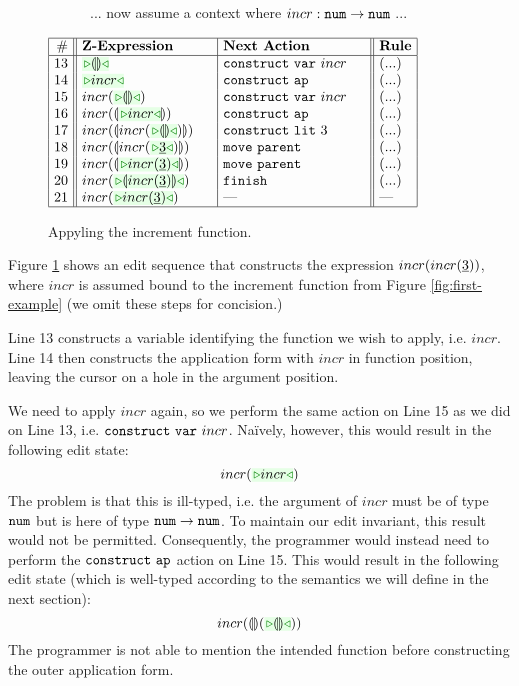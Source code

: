 \begin{figure}[t!]
\colorbox{light-gray}{~~~~~~... now assume a context where $incr : \texttt{num} \rightarrow \texttt{num}$ ...~~~~~~}

$\arraycolsep=4px
\begin{array}{|r||l|l||l|l|}
\hline
\# & \textbf{Z-Expression} & 
\textbf{Next Action} & \textbf{Rule}
\\
\hline
13 &
\zwsel{\hhole{}} & 
\aConstruct{\fvar{incr}} \hphantom{~\,\,~~}& 
\text{(...)}
\\ 14 & 
\zwsel{incr} & 
\aConstruct{\fap} & 
\text{(...)}
\\ 15 & 
incr(\zwsel{\hhole{}}) & 
\aConstruct{\fvar{incr}} & 
\text{(...)}
\\ 16 & 
incr(\hhole{\zwsel{incr}}) & 
\aConstruct{\fap} & 
\text{(...)}
\\ 17 & 
incr(\hhole{incr(\zwsel{\hhole{}})}) \hphantom{~~~~} & 
\aConstruct{\fnumlit{3}} & 
\text{(...)}
\\ 18 & 
incr(\hhole{incr(\zwsel{\hnum{3}})}) & 
\aMove{\dParent}& 
\text{(...)}
\\ 19 & 
incr(\hhole{\zwsel{incr(\hnum{3})}}) & 
\aMove{\dParent} & 
\text{(...)}
\\ 20 &
incr(\zwsel{\hhole{incr(\hnum{3})}})& 
\aFinish & 
\text{(...)}
\\ 21 & 
incr(\zwsel{incr(\hnum{3})}) & 
\textrm{---} & 
{\textrm{---}}
\\ \hline
\end{array}
$
\caption{Appyling the increment function.}
\label{fig:second-example}
\end{figure}

Figure \ref{fig:second-example} shows an edit sequence that constructs the expression $incr(incr(\underline{3}))$, where $incr$ is assumed bound to the increment function from Figure \ref{fig:first-example} (we omit these steps for concision.)

Line 13 constructs a variable identifying the function we wish to apply, i.e. $incr$. Line 14 then constructs the application form with $incr$ in function position, leaving the cursor on a hole in the argument position.

We need to apply $incr$ again, so we perform the same action on Line 15 as we did on Line 13, i.e. $\mathtt{construct}~\mathtt{var}~incr$. Na\"ively, however, this would result in the following edit state: 
\[
incr(\zwsel{incr})
\]
The problem is that this is ill-typed, i.e. the argument of $incr$ must be of type $\texttt{num}$ but is here of type $\texttt{num} \rightarrow \texttt{num}$. To maintain our edit invariant, this result would not be permitted. Consequently, the programmer would instead need to perform the $\mathtt{construct}~\mathtt{ap}$ action on Line 15. This would result in the following edit state (which is well-typed according to the semantics we will define in the next section):
\[
incr(\hhole{}(\zwsel{\hhole{}}))
\]
The programmer is not able to mention the intended function before constructing the outer application form.

